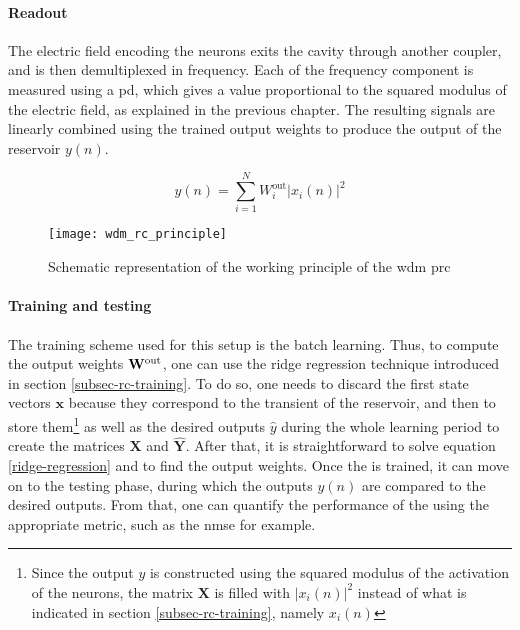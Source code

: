 \paragraph{Readout}

The electric field encoding the neurons exits the cavity through another coupler, and is then demultiplexed in frequency. Each of the frequency component is measured using a \gls{pd}, which gives a value proportional to the squared modulus of the electric field, as explained in the previous chapter. The resulting signals are linearly combined using the trained output weights to produce the output of the reservoir $y(n)$.

\begin{equation}
	y(n) = \sum_{i=1}^{N} W_i^{\text{out}} |x_i(n)|^2
\end{equation}

\begin{figure}[h]
	\centering
	\texttt{[image: wdm\_rc\_principle]}
	\caption{Schematic representation of the working principle of the \gls{wdm} \gls{prc} \cite{AkroutAkram2016Pprc}}
	\label{wdm_rc_principle}
\end{figure}

\paragraph{Training and testing}

The training scheme used for this setup is the batch learning. Thus, to compute the output weights $\mathbf{W}^{\text{out}}$, one can use the ridge regression technique introduced in section \ref{subsec-rc-training}. To do so, one needs to discard the first state vectors $\mathbf{x}$ because they correspond to the transient of the reservoir, and then to store them\footnote{Since the output $y$ is constructed using the squared modulus of the activation of the neurons, the matrix $\mathbf{X}$ is filled with $|x_i(n)|^2$ instead of what is indicated in section \ref{subsec-rc-training}, namely $x_i(n)$} as well as the desired outputs $\hat{y}$ during the whole learning period to create the matrices $\mathbf{X}$ and $\hat{\mathbf{Y}}$. After that, it is straightforward to solve equation \eqref{ridge-regression} and to find the output weights. Once the \rcer is trained, it can move on to the testing phase, during which the outputs $y(n)$ are compared to the desired outputs. From that, one can quantify the performance of the \rcer using the appropriate metric, such as the \gls{nmse} for example.

